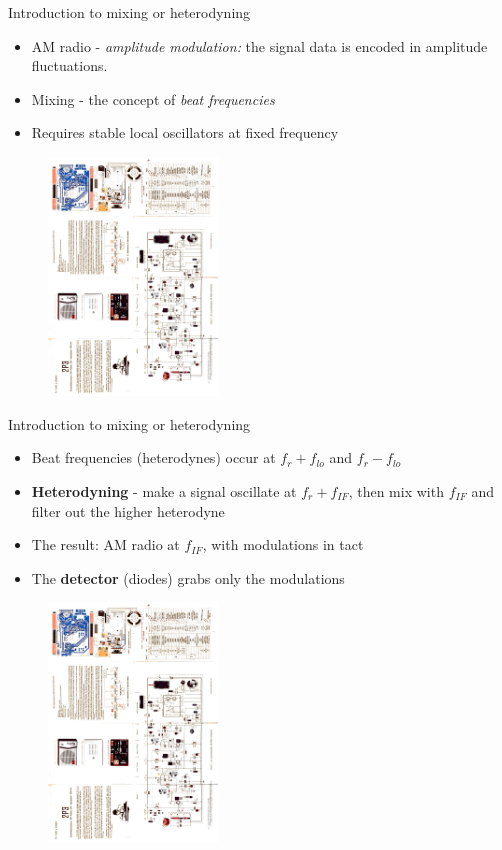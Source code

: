 \documentclass{beamer}
\begin{document}
\begin{frame}{Introduction to mixing or heterodyning}
\small
\begin{itemize}
\item AM radio - \textit{amplitude modulation:} the signal data is encoded in amplitude fluctuations.
\item Mixing - the concept of \textit{beat frequencies}
\item Requires stable \alert{local oscillators} at fixed frequency
\end{itemize}
\begin{figure}
\centering
\includegraphics[width=0.4\textwidth,angle=270,trim=6.75cm 15cm 10.5cm 8cm,clip=true]{figures/2P3.pdf}
\end{figure}
\end{frame}

\begin{frame}{Introduction to mixing or heterodyning}
\small
\begin{itemize}
\item Beat frequencies (heterodynes) occur at $f_{r} + f_{lo}$ and $f_{r} - f_{lo}$
\item \textbf{Heterodyning} - make a signal oscillate at $f_{r} + f_{IF}$, then mix with $f_{IF}$ and filter out the higher heterodyne
\item The result: AM radio at $f_{IF}$, with modulations in tact
\item The \textbf{detector} (diodes) grabs only the modulations
\end{itemize}
\begin{figure}
\centering
\includegraphics[width=0.4\textwidth,angle=270,trim=6.75cm 15cm 10.5cm 8cm,clip=true]{figures/2P3.pdf}
\end{figure}
\end{frame}
\end{document}
